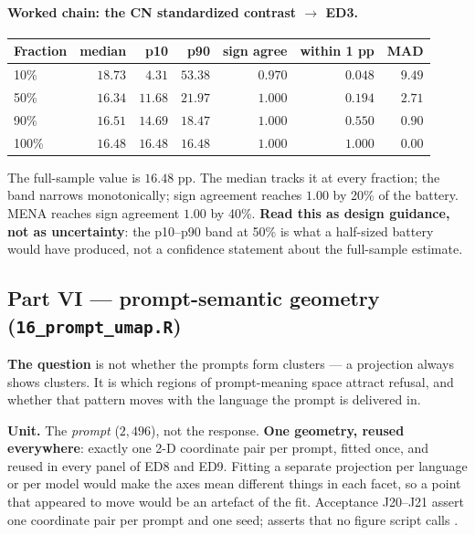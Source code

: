 \documentclass[11pt]{article}
\DeclareRobustCommand{\file}[1]{\texttt{\seqsplit{#1}}}
\DeclareRobustCommand{\code}[1]{\texttt{\seqsplit{#1}}}
\DeclareRobustCommand{\hfile}[1]{\texttt{#1}}
\begin{document}
\paragraph{Worked chain: the CN standardized contrast $\rightarrow$ ED3.}

\begin{center}
\small
\begin{tabular}{@{}lrrrrrr@{}}
\toprule
\textbf{Fraction} & \textbf{median} & \textbf{p10} & \textbf{p90} & \textbf{sign agree} & \textbf{within 1 pp} & \textbf{MAD} \\
\midrule
10\%  & $18.73$ & $4.31$  & $53.38$ & $0.970$ & $0.048$ & $9.49$ \\
50\%  & $16.34$ & $11.68$ & $21.97$ & $1.000$ & $0.194$ & $2.71$ \\
90\%  & $16.51$ & $14.69$ & $18.47$ & $1.000$ & $0.550$ & $0.90$ \\
100\% & $16.48$ & $16.48$ & $16.48$ & $1.000$ & $1.000$ & $0.00$ \\
\bottomrule
\end{tabular}
\end{center}

\noindent The full-sample value is $16.48$ pp. The median tracks it at every
fraction; the band narrows monotonically; sign agreement reaches $1.00$ by 20\%
of the battery. MENA reaches sign agreement $1.00$ by 40\%. \textbf{Read this as
design guidance, not as uncertainty}: the p10--p90 band at 50\% is what a
half-sized battery would have produced, not a confidence statement about the
full-sample estimate.

\subsection{Part VI --- prompt-semantic geometry (\hfile{16\_prompt\_umap.R})}

\textbf{The question} is not whether the prompts form clusters --- a projection
always shows clusters. It is which regions of prompt-meaning space attract
refusal, and whether that pattern moves with the language the prompt is
delivered in.

\textbf{Unit.} The \emph{prompt} ($2{,}496$), not the response. \textbf{One
geometry, reused everywhere}: exactly one 2-D coordinate pair per prompt, fitted
once, and reused in every panel of ED8 and ED9. Fitting a separate projection
per language or per model would make the axes mean different things in each
facet, so a point that appeared to move would be an artefact of the fit.
Acceptance J20--J21 assert one coordinate pair per prompt and one seed;
\file{audit\_figures.R} asserts that no figure script calls \code{uwot}.
\end{document}
